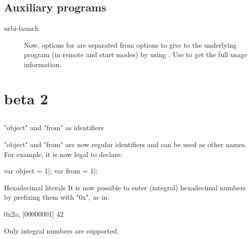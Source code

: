\subsection{Auxiliary programs}

\begin{description}
\item[urbi-launch] Now, options for  are separated from
  options to give to the underlying program (in remote and start modes) by
  using \option{--}. Use  to get the full usage
  information.
\end{description}



\section{ beta 2}

\subsection{\us}

\begin{description}
\item "object" and "from" as identifiers

  "object" and "from" are now regular identifiers and can be used as other
  names.  For example, it is now legal to declare:

\begin{urbiscript}
var object = 1|;
var from = 1|;
\end{urbiscript}

\item Hexadecimal literals
  It is now possible to enter (integral) hexadecimal numbers by
  prefixing them with "0x", as in:

\begin{urbiscript}
0x2a;
[00000001] 42
\end{urbiscript}

Only integral numbers are supported.

\end{description}

